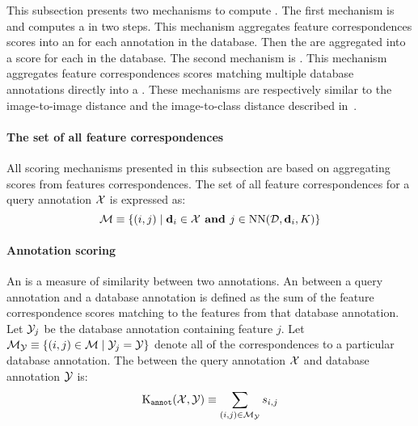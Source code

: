         This subsection presents two mechanisms to compute \namescores{}.
        The first mechanism is \csumprefix{} and computes a \namescore{} in two steps.
        This mechanism aggregates feature correspondences scores into an \annotscore{} for each annotation in the
          database.
        Then the \annotscores{} are aggregated into a score for each \name{} in the database.
        The second mechanism is \nsumprefix{}.
        This mechanism aggregates feature correspondences scores matching multiple database annotations directly
          into a \namescore{}.
        These mechanisms are respectively similar to the image-to-image distance and the image-to-class distance
          described in~\cite{boiman_defense_2008}.

        \paragraph{The set of all feature correspondences}
        All scoring mechanisms presented in this subsection are based on aggregating scores from features
          correspondences.
        The set of all feature correspondences for a query annotation $\mathcal{X}$ is expressed as:
        \begin{equation}
            \mathcal{M} \equiv \{(i, j) \mid \mathbf{d}_i \in \mathcal{X} \textbf{ and } j \in \operatorname{NN}(\mathcal{D}, \mathbf{d}_i, K)\}
        \end{equation}

        \paragraph{Annotation scoring}
            An \annotscore{} is a measure of similarity between two annotations.
            An \annotscore{} between a query annotation and a database annotation is defined as the sum of the
              feature correspondence scores matching to the features from that database annotation.
            Let $\mathcal{Y}_j$ be the database annotation containing feature $j$.
            Let
            $\mathcal{M}_{\mathcal{Y}} \equiv \left\{(i, j) \in \mathcal{M} \mid \mathcal{Y}_j = \mathcal{Y}\right\}$
            denote all of the correspondences to a particular database annotation.
            The \annotscore{} between the query annotation $\mathcal{X}$ and database annotation $\mathcal{Y}$ is:
            \begin{equation}
                \operatorname{K_{\tt annot}}(\mathcal{X}, \mathcal{Y}) \equiv \sum_{(i, j) \in \mathcal{M}_{\mathcal{Y}}} s_{i, j}
            \end{equation}

